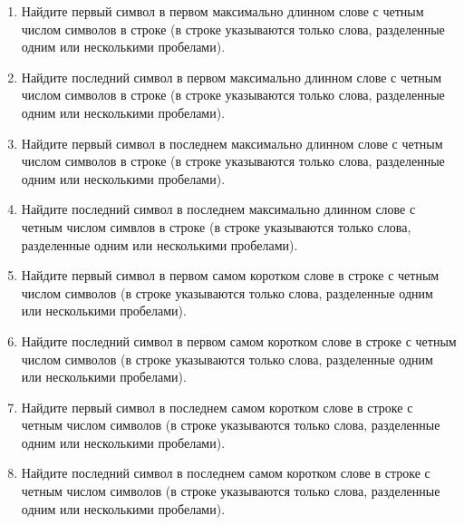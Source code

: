 \begin{enumerate}
\item Найдите первый символ в первом максимально длинном слове с четным числом символов в строке (в строке указываются только слова, разделенные одним или несколькими пробелами). 
\item Найдите последний символ в первом максимально длинном слове с четным числом символов в строке (в строке указываются только слова, разделенные одним или несколькими пробелами). 
\item Найдите первый символ в последнем максимально длинном слове с четным числом символов в строке (в строке указываются только слова, разделенные одним или несколькими пробелами). 
\item Найдите последний символ в последнем максимально длинном слове с четным числом симвлов в строке (в строке указываются только слова, разделенные одним или несколькими пробелами). 
\item Найдите первый символ в первом самом коротком слове в строке с четным числом символов (в строке указываются только слова, разделенные одним или несколькими пробелами). 
\item Найдите последний символ в первом самом коротком слове в строке с четным числом символов (в строке указываются только слова, разделенные одним или несколькими пробелами). 
\item Найдите первый символ в последнем самом коротком слове в строке с четным числом символов (в строке указываются только слова, разделенные одним или несколькими пробелами). 
\item Найдите последний символ в последнем самом коротком слове в строке с четным числом символов (в строке указываются только слова, разделенные одним или несколькими пробелами). 


\end{enumerate}

